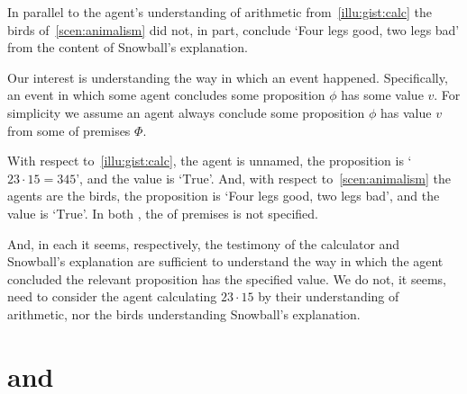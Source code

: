 \begin{note}
  In parallel to the agent's understanding of arithmetic from~\autoref{illu:gist:calc} the birds of~\autoref{scen:animalism} did not, in part, conclude `Four legs good, two legs bad' from the content of Snowball's explanation.

  Our interest is understanding the way in which an event happened.
  Specifically, an event in which some agent \vAgent{} concludes some proposition \(\phi\) has some value \(v\).
  For simplicity we assume an agent always conclude some proposition \(\phi\) has value \(v\) from some \poP{} of premises \(\Phi\).

  With respect to~\autoref{illu:gist:calc}, the agent is unnamed, the proposition is `\(23 \cdot 15 = 345\)', and the value is `\(\text{True}\)'.
  And, with respect to~\autoref{scen:animalism} the agents are the birds, the proposition is `Four legs good, two legs bad', and the value is `\(\text{True}\)'.
  In both , the \poP{} of premises is not specified.

  And, in each  it seems, respectively, the testimony of the calculator and Snowball's explanation are sufficient to understand the way in which the agent concluded the relevant proposition has the specified value.
  We do not, it seems, need to consider the agent calculating \(23 \cdot 15\) by their understanding of arithmetic, nor the birds understanding Snowball's explanation.
\end{note}

\section{\qWhy{} and \qHow{}}


